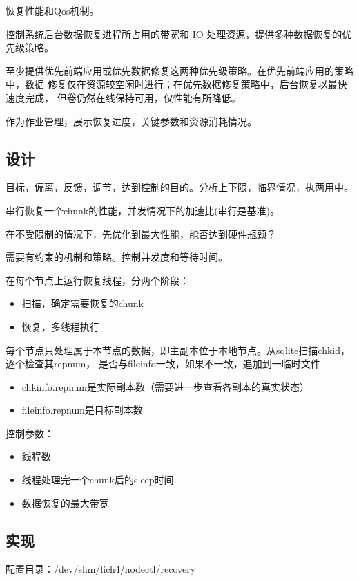 恢复性能和Qos机制。

控制系统后台数据恢复进程所占用的带宽和 IO 处理资源，提供多种数据恢复的优先级策略。

至少提供优先前端应用或优先数据修复这两种优先级策略。在优先前端应用的策略中，数据
修复仅在资源较空闲时进行；在优先数据修复策略中，后台恢复以最快速度完成，
但卷仍然在线保持可用，仅性能有所降低。

作为作业管理，展示恢复进度，关键参数和资源消耗情况。

\subsection{设计}

目标，偏离，反馈，调节，达到控制的目的。分析上下限，临界情况，执两用中。

串行恢复一个chunk的性能，并发情况下的加速比(串行是基准)。

在不受限制的情况下，先优化到最大性能，能否达到硬件瓶颈？

需要有约束的机制和策略。控制并发度和等待时间。

在每个节点上运行恢复线程，分两个阶段：
\begin{itemize}
    \item 扫描，确定需要恢复的chunk
    \item 恢复，多线程执行
\end{itemize}

每个节点只处理属于本节点的数据，即主副本位于本地节点。从sqlite扫描chkid，逐个检查其repnum，
是否与fileinfo一致，如果不一致，追加到一临时文件
\begin{itemize}
    \item chkinfo.repnum是实际副本数（需要进一步查看各副本的真实状态）
    \item fileinfo.repnum是目标副本数
\end{itemize}

控制参数：
\begin{itemize}
    \item 线程数
    \item 线程处理完一个chunk后的sleep时间
    \item 数据恢复的最大带宽
\end{itemize}

\subsection{实现}

配置目录：/dev/shm/lich4/nodectl/recovery

